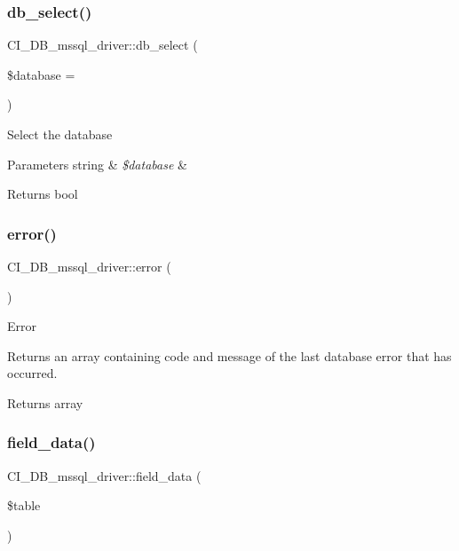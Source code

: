 \subsubsection{\texorpdfstring{db\+\_\+select()}{db\_select()}}
{\footnotesize\ttfamily C\+I\+\_\+\+D\+B\+\_\+mssql\+\_\+driver\+::db\+\_\+select (\begin{DoxyParamCaption}\item[{}]{\$database = {\ttfamily \textquotesingle{}\textquotesingle{}} }\end{DoxyParamCaption})}

Select the database


\begin{DoxyParams}[1]{Parameters}
string & {\em \$database} & \\
\hline
\end{DoxyParams}
\begin{DoxyReturn}{Returns}
bool 
\end{DoxyReturn}
\mbox{\label{class_c_i___d_b__mssql__driver_ae24ae4efe05103a9db96af64e2ed7877}} 
\subsubsection{\texorpdfstring{error()}{error()}}
{\footnotesize\ttfamily C\+I\+\_\+\+D\+B\+\_\+mssql\+\_\+driver\+::error (\begin{DoxyParamCaption}{ }\end{DoxyParamCaption})}

Error

Returns an array containing code and message of the last database error that has occurred.

\begin{DoxyReturn}{Returns}
array 
\end{DoxyReturn}
\mbox{\label{class_c_i___d_b__mssql__driver_ac13ce87ffc4570a1154e339fd68bea9c}} 
\subsubsection{\texorpdfstring{field\+\_\+data()}{field\_data()}}
{\footnotesize\ttfamily C\+I\+\_\+\+D\+B\+\_\+mssql\+\_\+driver\+::field\+\_\+data (\begin{DoxyParamCaption}\item[{}]{\$table }\end{DoxyParamCaption})}

